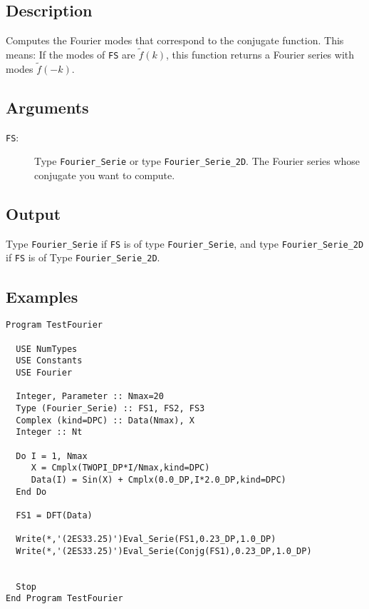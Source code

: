 \subsection{Description}

Computes the Fourier modes that correspond to the conjugate
function. This means: If the modes of \texttt{FS} are $\tilde f(k)$,
this function returns a Fourier series with modes $\tilde f(-k)$.

\subsection{Arguments}

\begin{description}
\item[\texttt{FS}:] Type \texttt{Fourier\_Serie} or type
  \texttt{Fourier\_Serie\_2D}. The Fourier series whose conjugate you
  want to compute.
\end{description}

\subsection{Output}

Type \texttt{Fourier\_Serie} if \texttt{FS} is of type
\texttt{Fourier\_Serie}, and type \texttt{Fourier\_Serie\_2D} if
\texttt{FS} is of Type \texttt{Fourier\_Serie\_2D}.

\subsection{Examples}

\begin{lstlisting}[emph=Conjg,
                   emphstyle=\color{blue},
                   frame=trBL,
                   caption=Computing the Conjugate Fourier Series.,
                   label=conjg]
Program TestFourier

  USE NumTypes
  USE Constants
  USE Fourier

  Integer, Parameter :: Nmax=20
  Type (Fourier_Serie) :: FS1, FS2, FS3
  Complex (kind=DPC) :: Data(Nmax), X
  Integer :: Nt

  Do I = 1, Nmax
     X = Cmplx(TWOPI_DP*I/Nmax,kind=DPC)
     Data(I) = Sin(X) + Cmplx(0.0_DP,I*2.0_DP,kind=DPC)
  End Do

  FS1 = DFT(Data)

  Write(*,'(2ES33.25)')Eval_Serie(FS1,0.23_DP,1.0_DP)
  Write(*,'(2ES33.25)')Eval_Serie(Conjg(FS1),0.23_DP,1.0_DP)


  Stop
End Program TestFourier
\end{lstlisting}

